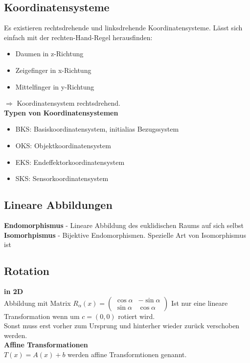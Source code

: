 \subsection{Koordinatensysteme}
Es existieren rechtsdrehende und linksdrehende Koordinatensysteme. Lässt sich einfach mit der rechten-Hand-Regel herausfinden:\\
\begin{itemize}
  \item Daumen in z-Richtung
  \item Zeigefinger in x-Richtung
  \item Mittelfinger in y-Richtung
\end{itemize}
\(\Rightarrow\) Koordinatensystem rechtsdrehend.\\

\textbf{Typen von Koordinatensystemen}\\
\begin{itemize}
  \item BKS: Basiskoordinatensystem, initialias Bezugssystem
  \item OKS: Objektkoordinatensystem
  \item EKS: Endeffektorkoordinatensystem
  \item SKS: Sensorkoordinatensystem
\end{itemize}

\subsection{Lineare Abbildungen}
\textbf{Endomorphismus} - Lineare Abbildung des euklidischen Raums auf sich selbst\\
\textbf{Isomorhpismus} - Bijektive Endomorphismen. Spezielle Art von Isomorphismus ist \SO

\subsection{Rotation}
\textbf{in 2D}\\
Abbildung mit Matrix \(R_\alpha(x) = \begin{pmatrix} \cos \alpha & -\sin\alpha \\ \sin \alpha & \cos \alpha\end{pmatrix}\)
Ist nur eine lineare Transformation wenn um \(c=(0,0)\) rotiert wird.\\
Sonst muss erst vorher zum Ursprung und hinterher wieder zurück verschoben werden.\\
\textbf{Affine Transformationen}\\
\(T(x) = A(x) + b\) werden affine Transformtionen genannt.\\

